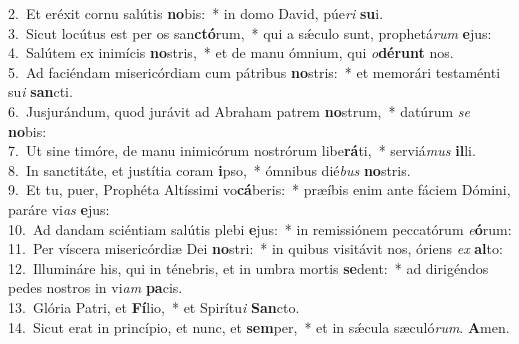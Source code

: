 {2.~}Et eréxit cornu salútis \textbf{no}bis:~* in domo David, púe\textit{ri} \textbf{su}i.\\
{3.~}Sicut locútus est per os san\textbf{ctó}rum,~* qui a sǽculo sunt, prophetá\textit{rum} \textbf{e}jus:\\
{4.~}Salútem ex inimícis \textbf{no}stris,~* et de manu ómnium, qui \textit{o}\textbf{dé}\textbf{runt} nos.\\
{5.~}Ad faciéndam misericórdiam cum pátribus \textbf{no}stris:~* et memorári testaménti su\textit{i} \textbf{san}cti.\\
{6.~}Jusjurándum, quod jurávit ad Abraham patrem \textbf{no}strum,~* datúrum \textit{se} \textbf{no}bis:\\
{7.~}Ut sine timóre, de manu inimicórum nostrórum libe\textbf{rá}ti,~* serviá\textit{mus} \textbf{il}li.\\
{8.~}In sanctitáte, et justítia coram \textbf{i}pso,~* ómnibus dié\textit{bus} \textbf{no}stris.\\
{9.~}Et tu, puer, Prophéta Altíssimi vo\textbf{cá}beris:~* præíbis enim ante fáciem Dómini, paráre vi\textit{as} \textbf{e}jus:\\
{10.~}Ad dandam sciéntiam salútis plebi \textbf{e}jus:~* in remissiónem peccatórum \textit{e}\textbf{ó}rum:\\
{11.~}Per víscera misericórdiæ Dei \textbf{no}stri:~* in quibus visitávit nos, óriens \textit{ex} \textbf{al}to:\\
{12.~}Illumináre his, qui in ténebris, et in umbra mortis \textbf{se}dent:~* ad dirigéndos pedes nostros in vi\textit{am} \textbf{pa}cis.\\
{13.~}Glória Patri, et \textbf{Fí}lio,~* et Spirítu\textit{i} \textbf{San}cto.\\
{14.~}Sicut erat in princípio, et nunc, et \textbf{sem}per,~* et in sǽcula sæculó\textit{rum}. \textbf{A}men.\\
